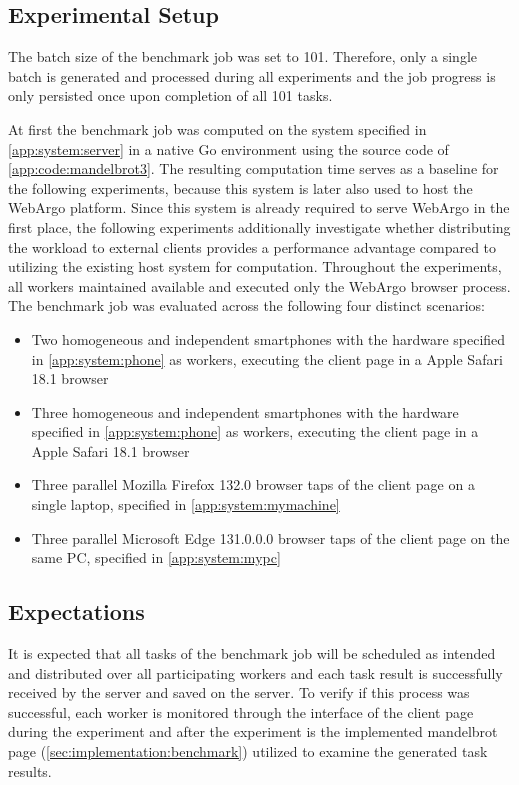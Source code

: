 \subsection{Experimental Setup}
The batch size of the benchmark job was set to 101. Therefore, only a single batch is generated and processed during all experiments and the job progress is only persisted once upon completion of all 101 tasks.

At first the benchmark job was computed on the system specified in \autoref{app:system:server} in a native Go environment using the source code of \autoref{app:code:mandelbrot3}. The resulting computation time serves as a baseline for the following experiments, because this system is later also used to host the WebArgo platform. Since this system is already required to serve WebArgo in the first place, the following experiments additionally investigate whether distributing the workload to external clients provides a performance advantage compared to utilizing the existing host system for computation. Throughout the experiments, all workers maintained available and executed only the WebArgo browser process. The benchmark job was evaluated across the following four distinct scenarios:
\begin{itemize}
    \item Two homogeneous and independent smartphones with the hardware specified in \autoref{app:system:phone} as workers, executing the client page in a Apple Safari 18.1 \cite{evaluation:safari} browser
    \item Three homogeneous and independent smartphones with the hardware specified in \autoref{app:system:phone} as workers, executing the client page in a Apple Safari 18.1 \cite{evaluation:safari} browser
    \item Three parallel Mozilla Firefox 132.0 \cite{background:firefox} browser taps of the client page on a single laptop, specified in \autoref{app:system:mymachine}
    \item Three parallel Microsoft Edge 131.0.0.0 \cite{evaluation:edge} browser taps of the client page on the same \acs{PC}, specified in \autoref{app:system:mypc}
\end{itemize}

\subsection{Expectations}
It is expected that all tasks of the benchmark job will be scheduled as intended and distributed over all participating workers and each task result is successfully received by the server and saved on the server. To verify if this process was successful, each worker is monitored through the interface of the client page during the experiment and after the experiment is the implemented mandelbrot page (\autoref{sec:implementation:benchmark}) utilized to examine the generated task results.

